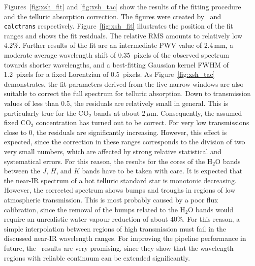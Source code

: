 Figures~\ref{fig:xsh_fit} and \ref{fig:xsh_tac} show the results of the fitting
procedure and the telluric absorption correction. The figures were created by
\mf\ and {\tt calctrans} respectively. Figure~\ref{fig:xsh_fit} illustrates
the position of the fit ranges and shows the fit residuals. The relative RMS
amounts to relatively low 4.2\%. Further results of the fit are an intermediate
\ac{PWV} value of 2.4\,mm, a moderate average wavelength shift of 0.35~pixels
of the observed spectrum towards shorter wavelengths, and a best-fitting
Gaussian kernel FWHM of 1.2~pixels for a fixed Lorentzian of 0.5~pixels. As
Figure~\ref{fig:xsh_tac} demonstrates, the fit parameters derived from the
five narrow windows are also suitable to correct the full spectrum for telluric
absorption. Down to transmission values of less than 0.5, the residuals are
relatively small in general. This is particularly true for the CO$_2$ bands at
about 2\,$\mu$m. Consequently, the assumed fixed CO$_2$ concentration has
turned out to be correct. For very low transmissions close to 0, the residuals
are significantly increasing. However, this effect is expected, since the
correction in these ranges corresponds to the division of two very small
numbers, which are affected by strong relative statistical and systematical
errors. For this reason, the results for the cores of the H$_2$O bands between
the $J$, $H$, and $K$ bands have to be taken with care. It is expected that the
near-IR spectrum of a hot telluric standard star is monotonic decreasing.
However, the corrected spectrum shows bumps and troughs in regions of low
atmospheric transmission. This is most probably caused by a poor flux
calibration, since the removal of the bumps related to the H$_2$O bands would
require an unrealistic water vapour reduction of about 40\%. For this reason, a
simple interpolation between regions of high transmission must fail in the
discussed near-IR wavelength ranges. For improving the pipeline performance in
future, the \mf\ results are very promising, since they show that the
wavelength regions with reliable continuum can be extended significantly.

